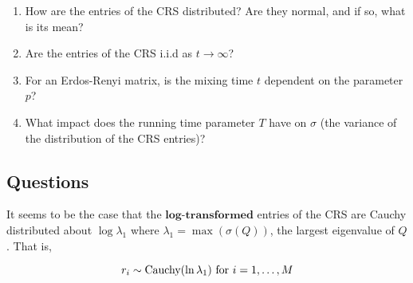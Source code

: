 \begin{enumerate}
  \item How are the entries of the CRS distributed? Are they normal, and if so, what is its mean?
  \item Are the entries of the CRS i.i.d as $t \to \infty$?
  \item For an Erdos-Renyi matrix, is the mixing time $t$ dependent on the parameter $p$?
  \item What impact does the running time parameter $T$ have on $\sigma$ (the variance of the distribution of the CRS entries)? 
\end{enumerate}

\subsection{Questions}

It seems to be the case that the $\textbf{log-transformed}$ entries of the CRS are Cauchy distributed about $\log{\lambda_1}$ where $\lambda_1 = \max(\sigma(Q))$, the largest eigenvalue of $Q$. That is,

$$r_i \sim \text{Cauchy}(\ln\lambda_1) \text{ for } i = \oneto[M]$$